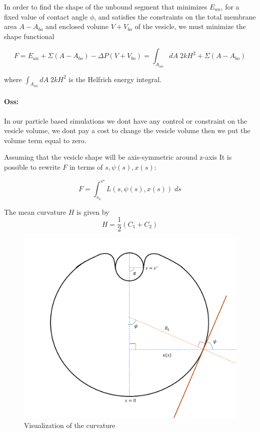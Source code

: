 \documentclass[12pt]{article}
\begin{document}
In order to find the shape of the unbound segment that minimizes $E_{un}$, for a fixed value of contact angle $\phi$, and satisfies the constraints on the total membrane area $A-A_{bo}$ and enclosed volume $V+V_{bo}$ of the vesicle, we must minimize the shape functional


$$
F = E_{un} + \Sigma(A-A_{bo}) - \Delta P (V+V_{bo}) = \int_{A_{un}} dA \; 2kH^2  + \Sigma(A-A_{bo})
$$

where $\int_{A_{un}} dA \; 2kH^2$ is the Helfrich energy integral.

\paragraph{Oss:} In our particle based simulations we dont have any control or constraint on the vesicle volume, we dont pay a cost to change the vesicle volume then we put the volume term equal to zero.


Assuming that the vesicle shape will be axis-symmetric around z-axis It is possible to rewrite $F$ in terms of $s,\psi(s),x(s)$:

$$
F = \int_{s_0}^{s^\star} L(s,\psi(s),x(s)) \; ds
$$


The mean curvature $H$ is given by 
$$H=\frac{1}{2}(C_1+C_2)$$

\begin{figure}[ht]
  \begin{center}
      \includegraphics[width=0.8\linewidth]{img/shape_equation_schematic.png}
      \caption{Visualization of the curvature}
  \end{center}
  \label{fig:figure2}
\end{figure}
\end{document}

